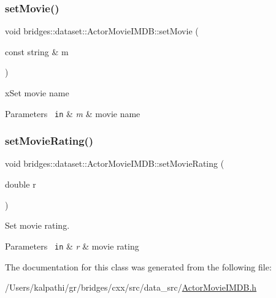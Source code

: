\subsubsection{\texorpdfstring{setMovie()}{setMovie()}}
{\footnotesize\ttfamily void bridges\+::dataset\+::\+Actor\+Movie\+I\+M\+D\+B\+::set\+Movie (\begin{DoxyParamCaption}\item[{const string \&}]{m }\end{DoxyParamCaption})\hspace{0.3cm}{\ttfamily [inline]}}



x\+Set movie name 


\begin{DoxyParams}[1]{Parameters}
\mbox{\texttt{ in}}  & {\em m} & movie name \\
\hline
\end{DoxyParams}
\mbox{\label{classbridges_1_1dataset_1_1_actor_movie_i_m_d_b_a432eeef484ea824538db670d2e16e791}} 
\subsubsection{\texorpdfstring{setMovieRating()}{setMovieRating()}}
{\footnotesize\ttfamily void bridges\+::dataset\+::\+Actor\+Movie\+I\+M\+D\+B\+::set\+Movie\+Rating (\begin{DoxyParamCaption}\item[{double}]{r }\end{DoxyParamCaption})\hspace{0.3cm}{\ttfamily [inline]}}



Set movie rating. 


\begin{DoxyParams}[1]{Parameters}
\mbox{\texttt{ in}}  & {\em r} & movie rating \\
\hline
\end{DoxyParams}


The documentation for this class was generated from the following file\+:\begin{DoxyCompactItemize}
\item 
/\+Users/kalpathi/gr/bridges/cxx/src/data\+\_\+src/\mbox{\hyperlink{_actor_movie_i_m_d_b_8h}{Actor\+Movie\+I\+M\+D\+B.\+h}}\end{DoxyCompactItemize}
